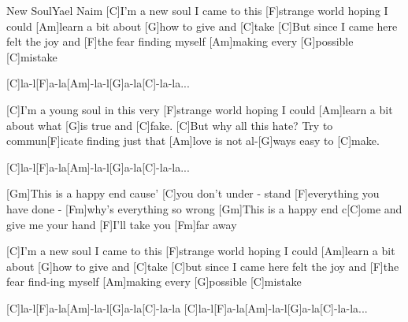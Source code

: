 \documentclass[../main.tex]{subfiles}
\begin{document}
\begin{song}{New Soul}{Yael Naim}{}
[C]I'm a new soul I came to this [F]strange world hoping I could
[Am]learn a bit about [G]how to give and [C]take
[C]But since I came here felt the joy and [F]the fear finding myself
[Am]making every [G]possible [C]mistake

[C]la-l[F]a-la[Am]-la-l[G]a-la[C]-la-la...

[C]I'm a young soul in this very [F]strange world hoping I could
[Am]learn a bit about what [G]is true and [C]fake.
[C]But why all this hate? Try to   commun[F]icate finding just that
[Am]love is not al-[G]ways easy to [C]make.

[C]la-l[F]a-la[Am]-la-l[G]a-la[C]-la-la...

[Gm]This is a happy end cause' [C]you don't under - stand
[F]everything you have done - [Fm]why's everything so wrong
[Gm]This is a happy end c[C]ome and give me your hand
[F]I'll take you [Fm]far away

[C]I'm a new soul I came to this [F]strange world hoping I could
[Am]learn a bit about [G]how to give and [C]take
[C]but since I came here felt the joy and [F]the fear find-ing myself
[Am]making every [G]possible [C]mistake

[C]la-l[F]a-la[Am]-la-l[G]a-la[C]-la-la
[C]la-l[F]a-la[Am]-la-l[G]a-la[C]-la-la...

\end{song}
\end{document}
